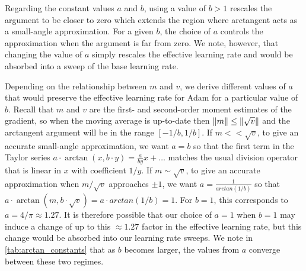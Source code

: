 \documentclass{article}
\theoremstyle{plain}
\theoremstyle{definition}
\theoremstyle{remark}
\begin{document}
Regarding the constant values $a$ and $b$, using a value of $b > 1$ rescales the argument to be closer to zero which extends the region where arctangent acts as a small-angle approximation. For a given $b$, the choice of $a$ controls the approximation when the argument is far from zero. We note, however, that changing the value of $a$ simply rescales the effective learning rate and would be absorbed into a sweep of the base learning rate.

Depending on the relationship between $m$ and $v$, we derive different values of $a$ that would preserve the effective learning rate for Adam for a particular value of $b$. Recall that $m$ and $v$ are the first- and second-order moment estimates of the gradient, so when the moving average is up-to-date then $\norm{m} \leq \norm{\sqrt{v}}$ and the arctangent argument will be in the range $[-1/b, 1/b]$. If $m << \sqrt{v}$, to give an accurate small-angle approximation, we want $a=b$ so that the first term in the Taylor series $a \cdot \arctan(x, b\cdot y) = \frac{a}{by} x + \ldots$ matches the usual division operator that is linear in $x$ with coefficient $1/y$. If $m \sim \sqrt{v}$, to give an accurate approximation when $m / \sqrt{v}$ approaches $\pm 1$, we want $a = \frac{1}{arctan(1/b)}$ so that $a \cdot \arctan(m, b \cdot \sqrt{v}) = a \cdot arctan(1/b) = 1$. For $b=1$, this corresponds to $a = 4 / \pi \approx 1.27$. It is therefore possible that our choice of $a=1$ when $b=1$ may induce a change of up to this $\approx 1.27$ factor in the effective learning rate, but this change would be absorbed into our learning rate sweeps. We note in \cref{tab:arctan_constants} that as $b$ becomes larger, the values from $a$ converge between these two regimes.













\newcommand{\figwidth}{0.2\paperwidth}
\newcommand{\figvspace}{\vspace{0.5cm}}
\newcommand{\appsinglefigure}[1]{\texttt{[image: \#1]}}
\end{document}
